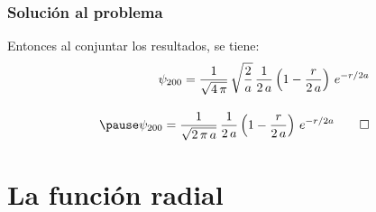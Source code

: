 \begin{frame}
\frametitle{Solución al problema}
Entonces al conjuntar los resultados, se tiene:
\begin{equation*}
\begin{aligned}
\psi_{200} = \dfrac{1}{\sqrt{4 \, \pi}} \, \sqrt{\dfrac{2}{a}} \, \dfrac{1}{2 \, a} \left( 1 - \dfrac{r}{2 \, a} \right) \, e^{-r/2a} \\[1em] \pause
\psi_{200} = \dfrac{1}{\sqrt{2 \, \pi \, a}} \, \dfrac{1}{2 \, a} \left( 1 - \dfrac{r}{2 \, a} \right) \, e^{-r/2a} \qed
\end{aligned}
\end{equation*}
\end{frame}
\section{La función radial}
